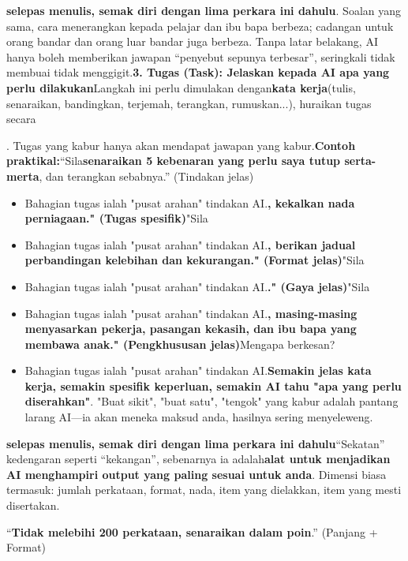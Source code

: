 \textbf{selepas menulis, semak diri dengan lima perkara ini dahulu}. Soalan yang sama, cara menerangkan kepada pelajar dan ibu bapa berbeza; cadangan untuk orang bandar dan orang luar bandar juga berbeza. Tanpa latar belakang, AI hanya boleh memberikan jawapan “penyebut sepunya terbesar”, seringkali tidak membuai tidak menggigit.\textbf{3. Tugas (Task): Jelaskan kepada AI apa yang perlu dilakukan}Langkah ini perlu dimulakan dengan\textbf{kata kerja}(tulis, senaraikan, bandingkan, terjemah, terangkan, rumuskan...), huraikan tugas secara


. Tugas yang kabur hanya akan mendapat jawapan yang kabur.\textbf{Contoh praktikal:}“Sila\textbf{senaraikan 5 kebenaran yang perlu saya tutup serta-merta}, dan terangkan sebabnya.” (Tindakan jelas)


\begin{itemize}
  \item Bahagian tugas ialah "pusat arahan" tindakan AI.\textbf{, kekalkan nada perniagaan." (Tugas spesifik)}"Sila
  \item Bahagian tugas ialah "pusat arahan" tindakan AI.\textbf{, berikan jadual perbandingan kelebihan dan kekurangan." (Format jelas)}"Sila
  \item Bahagian tugas ialah "pusat arahan" tindakan AI.\textbf{." (Gaya jelas)}"Sila
  \item Bahagian tugas ialah "pusat arahan" tindakan AI.\textbf{, masing-masing menyasarkan pekerja, pasangan kekasih, dan ibu bapa yang membawa anak." (Pengkhususan jelas)}Mengapa berkesan?
  \item Bahagian tugas ialah "pusat arahan" tindakan AI.\textbf{Semakin jelas kata kerja, semakin spesifik keperluan, semakin AI tahu "apa yang perlu diserahkan"}. "Buat sikit", "buat satu", "tengok" yang kabur adalah pantang larang AI—ia akan meneka maksud anda, hasilnya sering menyeleweng.
\end{itemize}

\textbf{selepas menulis, semak diri dengan lima perkara ini dahulu}“Sekatan” kedengaran seperti “kekangan”, sebenarnya ia adalah\textbf{alat untuk menjadikan AI menghampiri output yang paling sesuai untuk anda}. Dimensi biasa termasuk: jumlah perkataan, format, nada, item yang dielakkan, item yang mesti disertakan.


“\textbf{Tidak melebihi 200 perkataan, senaraikan dalam poin}.” (Panjang + Format)

